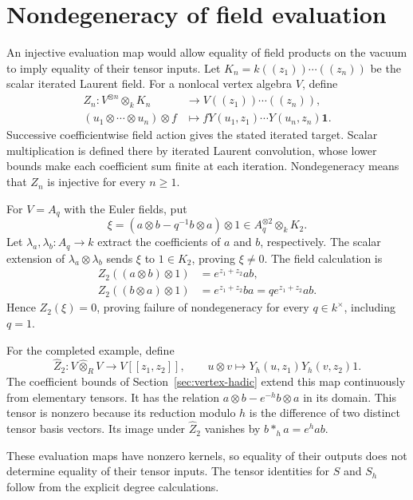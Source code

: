 \section{Nondegeneracy of field evaluation}
\label{sec:vertex-nondegeneracy}

An injective evaluation map would allow equality of field products
on the vacuum to imply equality of their tensor inputs.
Let $K_n=k((z_1))\cdots((z_n))$ be the scalar iterated Laurent field.
For a nonlocal vertex algebra $V$, define
\[
 \begin{aligned}
 Z_n:V^{\otimes n}\otimes_k K_n
   &\longrightarrow V((z_1))\cdots((z_n)),\\
 (u_1\otimes\cdots\otimes u_n)\otimes f
   &\longmapsto fY(u_1,z_1)\cdots Y(u_n,z_n)\mathbf1.
 \end{aligned}
\]
Successive coefficientwise field action gives the stated iterated target.
Scalar multiplication is defined there by iterated Laurent convolution,
whose lower bounds make each coefficient sum finite at each iteration.
Nondegeneracy means that $Z_n$ is injective for every $n\geq1$.

For $V=A_q$ with the Euler fields, put
\[
 \xi=(a\otimes b-q^{-1}b\otimes a)\otimes1
       \in A_q^{\otimes2}\otimes_kK_2.
\]
Let $\lambda_a,\lambda_b:A_q\to k$ extract the coefficients of
$a$ and $b$, respectively.
The scalar extension of $\lambda_a\otimes\lambda_b$ sends $\xi$ to
$1\in K_2$, proving $\xi\ne0$.
The field calculation is
\[
 \begin{aligned}
 Z_2((a\otimes b)\otimes1)&=e^{z_1+z_2}ab,\\
 Z_2((b\otimes a)\otimes1)&=e^{z_1+z_2}ba
                         =q e^{z_1+z_2}ab.
 \end{aligned}
\]
Hence $Z_2(\xi)=0$, proving failure of nondegeneracy for every
$q\in k^\times$, including $q=1$.

For the completed example, define
\[
 \widehat Z_2:V\widehat\otimes_RV\longrightarrow V[[z_1,z_2]],
 \qquad u\otimes v\longmapsto Y_h(u,z_1)Y_h(v,z_2)1.
\]
The coefficient bounds of Section~\ref{sec:vertex-hadic} extend this
map continuously from elementary tensors.
It has the relation $a\otimes b-e^{-h}b\otimes a$ in its domain.
This tensor is nonzero because its reduction modulo $h$ is the difference
of two distinct tensor basis vectors.
Its image under $\widehat Z_2$ vanishes by $b*_h a=e^h ab$.

These evaluation maps have nonzero kernels, so equality of their
outputs does not determine equality of their tensor inputs.
The tensor identities for $S$ and $S_h$ follow from the explicit
degree calculations.
